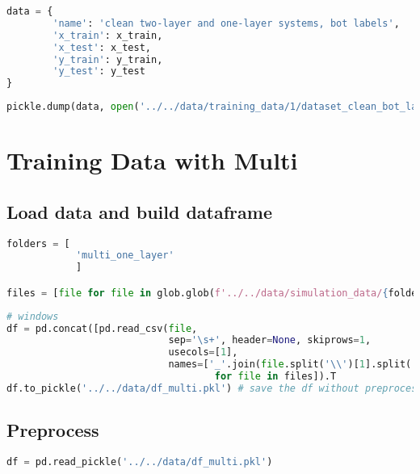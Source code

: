 \begin{lstlisting}[language=Python]
data = {
        'name': 'clean two-layer and one-layer systems, bot labels',
        'x_train': x_train,
        'x_test': x_test,
        'y_train': y_train,
        'y_test': y_test
}
\end{lstlisting}

\begin{lstlisting}[language=Python]
pickle.dump(data, open('../../data/training_data/1/dataset_clean_bot_layer.pkl', 'wb'))
\end{lstlisting}

\hypertarget{training-data-with-multi}{%
\section{Training Data with Multi}\label{training-data-with-multi}}

\hypertarget{load-data-and-build-dataframe}{%
\subsection{Load data and build
dataframe}\label{load-data-and-build-dataframe}}

\begin{lstlisting}[language=Python]
folders = [
            'multi_one_layer'
            ]

files = [file for file in glob.glob(f'../../data/simulation_data/{folders[0]}/*.spc')]
\end{lstlisting}

\begin{lstlisting}[language=Python]
# windows
df = pd.concat([pd.read_csv(file,
                            sep='\s+', header=None, skiprows=1,
                            usecols=[1],
                            names=['_'.join(file.split('\\')[1].split('_')[:-1])]).T 
                                    for file in files]).T
df.to_pickle('../../data/df_multi.pkl') # save the df without preprocessing
\end{lstlisting}

\hypertarget{preprocess}{%
\subsection{Preprocess}\label{preprocess}}

\begin{lstlisting}[language=Python]
df = pd.read_pickle('../../data/df_multi.pkl')
\end{lstlisting}

